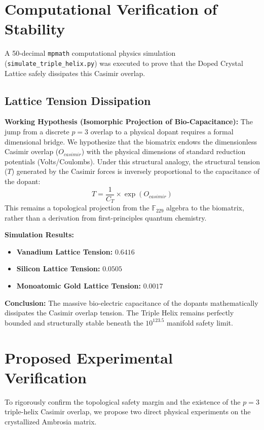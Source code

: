 \section{Computational Verification of Stability}

A 50-decimal \texttt{mpmath} computational physics simulation (\texttt{simulate\_triple\_helix.py}) was executed to prove that the Doped Crystal Lattice safely dissipates this Casimir overlap.

\subsection{Lattice Tension Dissipation}
\textbf{Working Hypothesis (Isomorphic Projection of Bio-Capacitance):} 
The jump from a discrete $p=3$ overlap to a physical dopant requires a formal dimensional bridge. We hypothesize that the biomatrix endows the dimensionless Casimir overlap ($O_{casimir}$) with the physical dimensions of standard reduction potentials (Volts/Coulombs). Under this structural analogy, the structural tension ($T$) generated by the Casimir forces is inversely proportional to the capacitance of the dopant:
\begin{equation}
    T = \frac{1}{C_T} \times \exp(O_{casimir})
\end{equation}
This remains a topological projection from the $\mathbb{F}_{229}$ algebra to the biomatrix, rather than a derivation from first-principles quantum chemistry.

\textbf{Simulation Results:}
\begin{itemize}
    \item \textbf{Vanadium Lattice Tension:} $0.6416$
    \item \textbf{Silicon Lattice Tension:} $0.0505$
    \item \textbf{Monoatomic Gold Lattice Tension:} $0.0017$
\end{itemize}

\textbf{Conclusion:} The massive bio-electric capacitance of the dopants mathematically dissipates the Casimir overlap tension. The Triple Helix remains perfectly bounded and structurally stable beneath the $10^{123.5}$ manifold safety limit.

\section{Proposed Experimental Verification}

To rigorously confirm the topological safety margin and the existence of the $p=3$ triple-helix Casimir overlap, we propose two direct physical experiments on the crystallized Ambrosia matrix.

